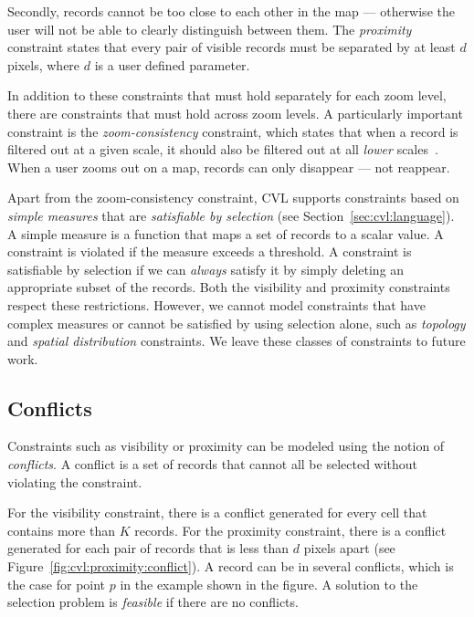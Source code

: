 \documentclass[11pt, oneside]{report}
\begin{document}
{Secondly, records cannot be too close to each other in the map --- otherwise the user will not be able to clearly distinguish between them. The \emph{proximity} constraint states that every pair of visible records must be separated by at least $d$ pixels, where $d$ is a user defined parameter.

In addition to these constraints that must hold separately for each zoom level, there are constraints that must hold across zoom levels. A particularly important constraint is the \emph{zoom-consistency} constraint, which states that when a record is filtered out at a given scale, it should also be filtered out at all \emph{lower} scales~\cite{sarma2012fusiontables}. When a user zooms out on a map, records can only disappear --- not reappear.

Apart from the zoom-consistency constraint, CVL supports constraints based on \emph{simple measures} that are \emph{satisfiable by selection} (see Section~\ref{sec:cvl:language}). A simple measure is a function that maps a set of records to a scalar value. A constraint is violated if the measure exceeds a threshold. A constraint is satisfiable by selection if we can \emph{always} satisfy it by simply deleting an appropriate subset of the records. Both the visibility and proximity constraints respect these restrictions. However, we cannot model constraints that have complex measures or cannot be satisfied by using selection alone, such as \emph{topology} and \emph{spatial distribution} constraints. We leave these classes of constraints to future work.

\subsection{Conflicts}
\label{sec:cvl:conflicts}

Constraints such as visibility or proximity can be modeled using the notion of \emph{conflicts}. A conflict is a set of records that cannot all be selected without violating the constraint.

For the visibility constraint, there is a conflict generated for every cell that contains more than $K$ records. For the proximity constraint, there is a conflict generated for each pair of records that is less than $d$ pixels apart (see Figure~\ref{fig:cvl:proximity:conflict}). A record can be in several conflicts, which is the case for point $p$ in the example shown in the figure. A solution to the selection problem is \emph{feasible} if there are no conflicts.

}
\end{document}
